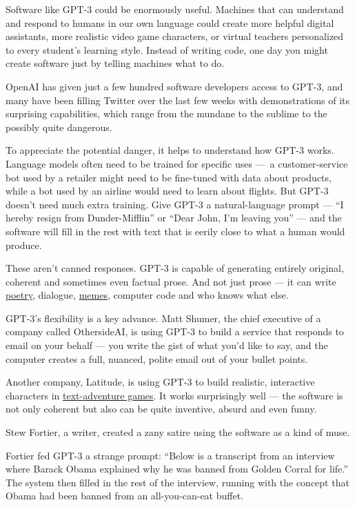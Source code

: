 Software like GPT-3 could be enormously useful. Machines that can
understand and respond to humans in our own language could create more
helpful digital assistants, more realistic video game characters, or
virtual teachers personalized to every student's learning style. Instead
of writing code, one day you might create software just by telling
machines what to do.

OpenAI has given just a few hundred software developers access to GPT-3,
and many have been filling Twitter over the last few weeks with
demonstrations of its surprising capabilities, which range from the
mundane to the sublime to the possibly quite dangerous.

To appreciate the potential danger, it helps to understand how GPT-3
works. Language models often need to be trained for specific uses ---~a
customer-service bot used by a retailer might need to be fine-tuned with
data about products, while a bot used by an airline would need to learn
about flights. But GPT-3 doesn't need much extra training. Give GPT-3 a
natural-language prompt --- ``I hereby resign from Dunder-Mifflin'' or
``Dear John, I'm leaving you'' --- and the software will fill in the
rest with text that is eerily close to what a human would produce.

These aren't canned responses. GPT-3 is capable of generating entirely
original, coherent and sometimes even factual prose. And not just prose
--- it can write \href{https://www.gwern.net/GPT-3\#poetry}{poetry},
dialogue,
\href{https://aiweirdness.com/post/624445709546029056/choose-your-quarantine-house}{memes},
computer code and who knows what else.

GPT-3's flexibility is a key advance. Matt Shumer, the chief executive
of a company called OthersideAI, is using GPT-3 to build a service that
responds to email on your behalf --- you write the gist of what you'd
like to say, and the computer creates a full, nuanced, polite email out
of your bullet points.

Another company, Latitude, is using GPT-3 to build realistic,
interactive characters in
\href{https://play.aidungeon.io}{text-adventure games}. It works
surprisingly well --- the software is not only coherent but also can be
quite inventive, absurd and even funny.

Stew Fortier, a writer, created a zany satire using the software as a
kind of muse.

Fortier fed GPT-3 a strange prompt: ``Below is a transcript from an
interview where Barack Obama explained why he was banned from Golden
Corral for life.'' The system then filled in the rest of the interview,
running with the concept that Obama had been banned from an
all-you-can-eat buffet.


